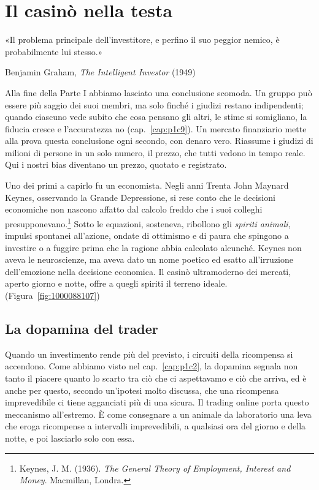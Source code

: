 \chapter{Il casin\`{o} nella testa}
\label{cap:p2c14}

\epigraph{«Il problema principale dell'investitore, e perfino il suo peggior nemico, è probabilmente lui stesso.»}{Benjamin Graham, \textit{The Intelligent Investor} (1949)}

Alla fine della Parte I abbiamo lasciato una conclusione scomoda. Un gruppo pu\`{o} essere pi\`{u} saggio dei suoi membri, ma solo finch\'{e} i giudizi restano indipendenti; quando ciascuno vede subito che cosa pensano gli altri, le stime si somigliano, la fiducia cresce e l'accuratezza no (cap.~\ref{cap:p1c9}). Un mercato finanziario mette alla prova questa conclusione ogni secondo, con denaro vero. Riassume i giudizi di milioni di persone in un solo numero, il prezzo, che tutti vedono in tempo reale. Qui i nostri bias diventano un prezzo, quotato e registrato.

Uno dei primi a capirlo fu un economista. Negli anni Trenta John Maynard Keynes, osservando la Grande Depressione, si rese conto che le decisioni economiche non nascono affatto dal calcolo freddo che i suoi colleghi presupponevano.\footnote{Keynes, J. M. (1936). \textit{The General Theory of Employment, Interest and Money}. Macmillan, Londra.} Sotto le equazioni, sosteneva, ribollono gli \textit{spiriti animali}, impulsi spontanei all'azione, ondate di ottimismo e di paura che spingono a investire o a fuggire prima che la ragione abbia calcolato alcunch\'{e}. Keynes non aveva le neuroscienze, ma aveva dato un nome poetico ed esatto all'irruzione dell'emozione nella decisione economica. Il casin\`{o} ultramoderno dei mercati, aperto giorno e notte, offre a quegli spiriti il terreno ideale. (Figura~\ref{fig:1000088107})

\section{La dopamina del trader}

Quando un investimento rende pi\`{u} del previsto, i circuiti della ricompensa si accendono. Come abbiamo visto nel cap.~\ref{cap:p1c2}, la dopamina segnala non tanto il piacere quanto lo scarto tra ci\`{o} che ci aspettavamo e ci\`{o} che arriva, ed \`{e} anche per questo, secondo un'ipotesi molto discussa, che una ricompensa imprevedibile ci tiene agganciati pi\`{u} di una sicura. Il trading online porta questo meccanismo all'estremo. \`{E} come consegnare a un animale da laboratorio una leva che eroga ricompense a intervalli imprevedibili, a qualsiasi ora del giorno e della notte, e poi lasciarlo solo con essa.

